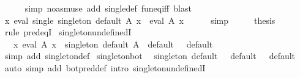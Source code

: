 \begin{isabellebody}
\ \ \ \ \isamarkupfalse%
\ {\isacharparenleft}{\kern0pt}simp\ {\isacharparenleft}{\kern0pt}no{\isacharunderscore}{\kern0pt}asm{\isacharunderscore}{\kern0pt}use{\isacharparenright}{\kern0pt}\ add{\isacharcolon}{\kern0pt}\ single{\isacharunderscore}{\kern0pt}def\ fun{\isacharunderscore}{\kern0pt}eq{\isacharunderscore}{\kern0pt}iff{\isacharparenright}{\kern0pt}\ blast\isanewline
\ \ \isamarkupfalse%
\ \isamarkupfalse%
\ {\isachardoublequoteopen}{\isasymAnd}x{\isachardot}{\kern0pt}\ eval\ {\isacharparenleft}{\kern0pt}single\ {\isacharparenleft}{\kern0pt}singleton\ default\ A{\isacharparenright}{\kern0pt}{\isacharparenright}{\kern0pt}\ x\ {\isacharequal}{\kern0pt}\ eval\ A\ x{\isachardoublequoteclose}\isanewline
\ \ \ \ \isamarkupfalse%
\ simp\isanewline
\ \ \isamarkupfalse%
\ \isamarkupfalse%
\ {\isacharquery}{\kern0pt}thesis\ \isamarkupfalse%
\ {\isacharparenleft}{\kern0pt}rule\ pred{\isacharunderscore}{\kern0pt}eqI{\isacharparenright}{\kern0pt}\isanewline
{}\isamarkupfalse%
%
\endisatagproof
{\isafoldproof}%
%
\isadelimproof
\isanewline
%
\endisadelimproof
\isanewline
{}\isamarkupfalse%
\ singleton{\isacharunderscore}{\kern0pt}undefinedI{\isacharcolon}{\kern0pt}\isanewline
\ \ {\isachardoublequoteopen}{\isasymnot}\ {\isacharparenleft}{\kern0pt}{\isasymexists}{\isacharbang}{\kern0pt}x{\isachardot}{\kern0pt}\ eval\ A\ x{\isacharparenright}{\kern0pt}\ {\isasymLongrightarrow}\ singleton\ default\ A\ {\isacharequal}{\kern0pt}\ default\ {\isacharparenleft}{\kern0pt}{\isacharparenright}{\kern0pt}{\isachardoublequoteclose}\ \ default\isanewline
%
\isadelimproof
\ \ %
\endisadelimproof
%
\isatagproof
{}\isamarkupfalse%
\ {\isacharparenleft}{\kern0pt}simp\ add{\isacharcolon}{\kern0pt}\ singleton{\isacharunderscore}{\kern0pt}def{\isacharparenright}{\kern0pt}%
\endisatagproof
{\isafoldproof}%
%
\isadelimproof
\isanewline
%
\endisadelimproof
\isanewline
{}\isamarkupfalse%
\ singleton{\isacharunderscore}{\kern0pt}bot{\isacharcolon}{\kern0pt}\isanewline
\ \ {\isachardoublequoteopen}singleton\ default\ {\isasymbottom}\ {\isacharequal}{\kern0pt}\ default\ {\isacharparenleft}{\kern0pt}{\isacharparenright}{\kern0pt}{\isachardoublequoteclose}\ \ default\isanewline
%
\isadelimproof
\ \ %
\endisadelimproof
%
\isatagproof
{}\isamarkupfalse%
\ {\isacharparenleft}{\kern0pt}auto\ simp\ add{\isacharcolon}{\kern0pt}\ bot{\isacharunderscore}{\kern0pt}pred{\isacharunderscore}{\kern0pt}def\ intro{\isacharcolon}{\kern0pt}\ singleton{\isacharunderscore}{\kern0pt}undefinedI{\isacharparenright}{\kern0pt}%

\end{isabellebody}
